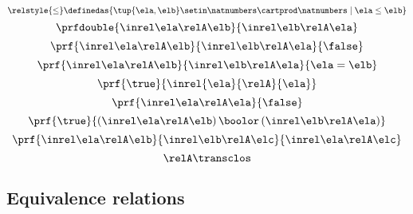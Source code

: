 \begin{forslides}
\begin{equation}
    \end{equation}
    \begin{equation}\label{eq:slides_session2_rel_149}
        \relstyle{\leq} \definedas  \{\tup{\ela,\elb}\setin \natnumbers\cartprod \natnumbers\mid \ela \leq \elb\}
    \end{equation}
    \begin{equation}\label{eq:slides_session2_rel_150}
        \prfdouble{
            \inrel \ela \relA \elb
        }{
            \inrel \elb \relA \ela
        }
    \end{equation}
    \begin{equation}\label{eq:slides_session2_rel_151}
        \prf{
            \inrel \ela \relA \elb
        }{
            \inrel \elb \relA \ela
        }{
            \false
        }
    \end{equation}
    \begin{equation}\label{eq:slides_session2_rel_152}
        \prf{
            \inrel \ela \relA \elb
        }{
            \inrel \elb \relA \ela
        }{
            \ela = \elb
        }
    \end{equation}
    \begin{equation}\label{eq:slides_session2_rel_153}
        \prf{\true}{\inrel{\ela}{\relA}{\ela}}
    \end{equation}
    \begin{equation}\label{eq:slides_session2_rel_154}
        \prf{
            \inrel \ela \relA \ela
        }{
            \false
        }
    \end{equation}
    \begin{equation}\label{eq:slides_session2_rel_155}
        \prf{
            \true
        }{
            (\inrel\ela\relA\elb )\,\boolor\, (\inrel\elb\relA\ela)
        }
    \end{equation}
    \begin{equation}\label{eq:slides_session2_rel_156}
        \prf{
            \inrel \ela \relA \elb
        }{
            \inrel \elb \relA \elc
        }{
            \inrel \ela \relA \elc
        }
    \end{equation}
    \begin{equation}\label{eq:slides_session2_rel_157}
        \relA\transclos
    \end{equation}

    \subsection{Equivalence relations}


\end{forslides}
